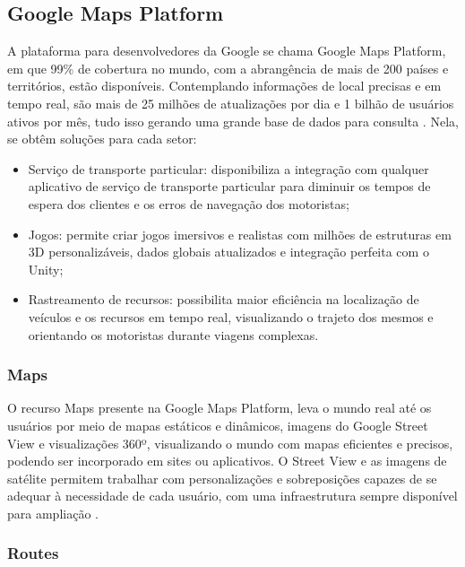\newpage
\subsection{Google Maps Platform}

A plataforma para desenvolvedores da Google se chama Google Maps Platform, em que 99\% de cobertura no mundo, com a abrangência de mais de 200 países e territórios, estão disponíveis. Contemplando informações de local precisas e em tempo real, são mais de 25 milhões de atualizações por dia e 1 bilhão de usuários ativos por mês, tudo isso gerando uma grande base de dados para consulta \cite{google:2019}. Nela, se obtêm soluções para cada setor:
\begin{itemize}
    \item Serviço de transporte particular: disponibiliza a integração com qualquer aplicativo de serviço de transporte particular para diminuir os tempos de espera dos clientes e os erros de navegação dos motoristas;
    \item Jogos: permite criar jogos imersivos e realistas com milhões de estruturas em 3D personalizáveis, dados globais atualizados e integração perfeita com o Unity;
    \item Rastreamento de recursos: possibilita maior eficiência na localização de veículos e os recursos em tempo real, visualizando o trajeto dos mesmos e orientando os motoristas durante viagens complexas. 
\end{itemize}

\subsubsection{Maps}

O recurso Maps presente na Google Maps Platform, leva o mundo real até os usuários por meio de mapas estáticos e dinâmicos, imagens do Google Street View e visualizações 360º, visualizando o mundo com mapas eficientes e precisos, podendo ser incorporado em sites ou aplicativos. O Street View e as imagens de satélite permitem  trabalhar com personalizações e sobreposições capazes de se adequar à necessidade de cada usuário, com uma infraestrutura sempre disponível para ampliação \cite{google:2019}. 

\subsubsection{Routes}

